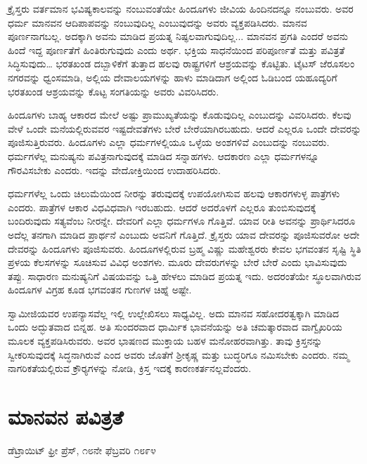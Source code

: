  ಕ್ರೈಸ್ತರು ವರ್ತಮಾನ ಭವಿಷ್ಯಕಾಲವನ್ನು ನಂಬುವಂತೆಯೇ ಹಿಂದೂಗಳು ಜೀವಿಯ ಹಿಂದಿನದನ್ನೂ ನಂಬುವರು. ಅವರ ಧರ್ಮ ಮಾನವನ ಆದಿಪಾಪವನ್ನು ನಂಬುವುದಿಲ್ಲ ಎಂಬುವುದನ್ನು ಅವರು ವ್ಯಕ್ತಪಡಿಸಿದರು. ಮಾನವ ಪೂರ್ಣನಾಗಬಲ್ಲ. ಅದಕ್ಕಾಗಿ ಅವನು ಮಾಡಿದ ಪ್ರಯತ್ನ ನಿಷ್ಫಲವಾಗುವುದಿಲ್ಲ... ಮಾನವನ ಪ್ರಗತಿ ಎಂದರೆ ಅವನು ಹಿಂದೆ ಇದ್ದ ಪೂರ್ಣತೆಗೆ ಹಿಂತಿರುಗುವುದು ಎಂದು ಅರ್ಥ. ಭಕ್ತಿಯ ಸಾಧನೆಯಿಂದ ಪರಿಪೂರ್ಣತೆ ಮತ್ತು ಪವಿತ್ರತೆ ಸಿದ್ಧಿಸುವುದು… ಭರತಖಂಡ ದಬ್ಬಾಳಿಕೆಗೆ ತುತ್ತಾದ ಹಲವು ರಾಷ್ಟ್ರಗಳಿಗೆ ಆಶ್ರಯವನ್ನು ಕೊಟ್ಟಿತು. ಟೈಟಸ್ ಜೆರೂಸಲಂ ನಗರವನ್ನು ಧ್ವಂಸಮಾಡಿ, ಅಲ್ಲಿಯ ದೇವಾಲಯಗಳನ್ನು ಹಾಳು ಮಾಡಿದಾಗ ಅಲ್ಲಿಂದ ಓಡಿಬಂದ ಯಹೂದ್ಯರಿಗೆ ಭರತಖಂಡ ಆಶ್ರಯವನ್ನು ಕೊಟ್ಟ ಸಂಗತಿಯನ್ನು ಅವರು ವಿವರಿಸಿದರು. 

 ಹಿಂದೂಗಳು ಬಾಹ್ಯ ಆಕಾರದ ಮೇಲೆ ಅಷ್ಟು ಪ್ರಾಮುಖ್ಯತೆಯನ್ನು ಕೊಡುವುದಿಲ್ಲ ಎಂಬುದನ್ನು ವಿವರಿಸಿದರು. ಕೆಲವು ವೇಳೆ ಒಂದೇ ಮನೆಯಲ್ಲಿರುವವರ ಇಷ್ಟದೇವತೆಗಳು ಬೇರೆ ಬೇರೆಯಾಗಿರಬಹುದು. ಆದರೆ ಎಲ್ಲರೂ ಒಂದೇ ದೇವರನ್ನು ಪೂಜಿಸುತ್ತಿರುವರು. ಹಿಂದೂಗಳು ಎಲ್ಲಾ ಧರ್ಮಗಳಲ್ಲಿಯೂ ಒಳ್ಳೆಯ ಅಂಶಗಳಿವೆ ಎಂಬುದನ್ನು ನಂಬುವರು. ಧರ್ಮಗಳೆಲ್ಲ ಮನುಷ್ಯನು ಪವಿತ್ರನಾಗುವುದಕ್ಕೆ ಮಾಡಿದ ಸನ್ನಾಹಗಳು. ಆದಕಾರಣ ಎಲ್ಲಾ ಧರ್ಮಗಳನ್ನೂ ಗೌರವಿಸಬೇಕು ಎಂದರು. ಇದನ್ನು ವೇದೋಕ್ತಿಯಿಂದ ಉದಾಹರಿಸಿದರು. 

 ಧರ್ಮಗಳೆಲ್ಲ ಒಂದು ಚಿಲುಮೆಯಿಂದ ನೀರನ್ನು ತರುವುದಕ್ಕೆ ಉಪಯೋಗಿಸುವ ಹಲವು ಆಕಾರಗಳುಳ್ಳ ಪಾತ್ರೆಗಳು ಎಂದರು. ಪಾತ್ರೆಗಳ ಆಕಾರ ವಿಧವಿಧವಾಗಿ ಇರಬಹುದು. ಆದರೆ ಅದರೊಳಗೆ ಎಲ್ಲರೂ ತುಂಬಿಸುವುದಕ್ಕೆ ಬಂದಿರುವುದು ಸತ್ಯವೆಂಬ ನೀರನ್ನೇ. ದೇವರಿಗೆ ಎಲ್ಲಾ ಧರ್ಮಗಳೂ ಗೊತ್ತಿವೆ. ಯಾವ ರೀತಿ ಅವನನ್ನು ಪ್ರಾರ್ಥಿಸಿದರೂ ಅದೆಲ್ಲ ತನಗಾಗಿ ಮಾಡಿದ ಪ್ರಾರ್ಥನೆ ಎಂಬುದು ಅವನಿಗೆ ಗೊತ್ತಿದೆ. ಕ್ರೈಸ್ತರು ಯಾವ ದೇವರನ್ನು ಪೂಜಿಸುವರೋ ಅದೇ ದೇವರನ್ನು ಹಿಂದೂಗಳು ಪೂಜಿಸುವರು. ಹಿಂದೂಗಳಲ್ಲಿರುವ ಬ್ರಹ್ಮ ವಿಷ್ಣು ಮಹೇಶ್ವರರು ಕೇವಲ ಭಗವಂತನ ಸೃಷ್ಟಿ ಸ್ಥಿತಿ ಪ್ರಳಯ ಕೆಲಸಗಳನ್ನು ಸೂಚಿಸುವ ವಿವಿಧ ಅಂಶಗಳು. ಮೂರು ದೇವರುಗಳನ್ನು ಬೇರೆ ಬೇರೆ ಎಂದು ಭಾವಿಸುವುದು ತಪ್ಪು. ಸಾಧಾರಣ ಮನುಷ್ಯನಿಗೆ ವಿಷಯವನ್ನು ಒತ್ತಿ ಹೇಳಲು ಮಾಡಿದ ಪ್ರಯತ್ನ ಇದು. ಅದರಂತೆಯೇ ಸ್ಥೂಲವಾಗಿರುವ ಹಿಂದೂಗಳ ವಿಗ್ರಹ ಕೂಡ ಭಗವಂತನ ಗುಣಗಳ ಚಿಹ್ನೆ ಅಷ್ಟೇ. 

 ಸ್ವಾಮೀಜಿಯವರ ಉಪನ್ಯಾಸವೆಲ್ಲ ಇಲ್ಲಿ ಉಲ್ಲೇಖಿಸಲು ಸಾಧ್ಯವಿಲ್ಲ. ಅದು ಮಾನವ ಸಹೋದರತ್ವಕ್ಕಾಗಿ ಮಾಡಿದ ಒಂದು ಅದ್ಭುತವಾದ ಬಿನ್ನಹ. ಅತಿ ಸುಂದರವಾದ ಧಾರ್ಮಿಕ ಭಾವನೆಯನ್ನು ಅತಿ ಚಮತ್ಕಾರವಾದ ವಾಗ್ವೈಖರಿಯ ಮೂಲಕ ವ್ಯಕ್ತಪಡಿಸಿರುವರು. ಅವರ ಭಾಷಣದ ಮುಕ್ತಾಯ ಬಹಳ ಮನೋಹರವಾಗಿತ್ತು. ತಾವು ಕ್ರಿಸ್ತನನ್ನು ಸ್ವೀಕರಿಸುವುದಕ್ಕೆ ಸಿದ್ಧನಾಗಿರುವೆ ಎಂದ ಅವರು ಜೊತೆಗೆ ಶ‍್ರೀಕೃಷ್ಣ ಮತ್ತು ಬುದ್ಧರಿಗೂ ನಮಿಸಬೇಕು ಎಂದರು. ನಮ್ಮ ನಾಗರಿಕತೆಯಲ್ಲಿರುವ ಕ್ರೌರ‍್ಯಗಳನ್ನು ನೋಡಿ, ಕ್ರಿಸ್ತ ಇದಕ್ಕೆ ಕಾರಣಕರ್ತನಲ್ಲವೆಂದರು.


\section*{ಮಾನವನ ಪವಿತ್ರತೆ }

\begin{flushright}
ಡೆಟ್ರಾಯಿಟ್ ಫ್ರೀ ಪ್ರೆಸ್, ೧೮ನೇ ಫೆಬ್ರವರಿ ೧೮೯೪ 
\end{flushright}

